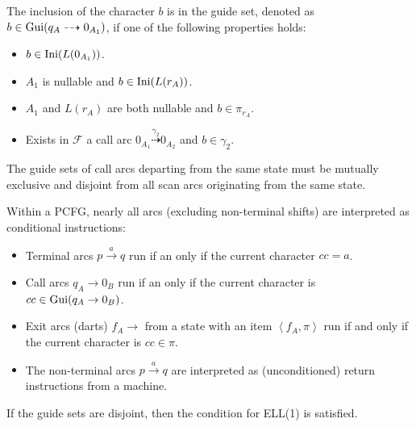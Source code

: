 The inclusion of the character $b$ is in the guide set, denoted as $b \in \textnormal{Gui}(q_A \dashrightarrow 0_{A_1})$, if one of the following properties holds:  
\begin{itemize}
    \item $b \in \textnormal{Ini}(L(0_{A_1}))$. 
    \item $A_1$ is nullable and $b \in \textnormal{Ini}(L(r_A))$. 
    \item $A_1$ and $L(r_A)$ are both nullable and $b \in \pi_{r_A}$.
    \item Exists in $\mathcal{F}$ a call arc $0_{A_1} \overset{\gamma_2}{\dashrightarrow} 0_{A_2}$ and $b \in \gamma_2$. 
\end{itemize}
The guide sets of call arcs departing from the same state must be mutually exclusive and disjoint from all scan arcs originating from the same state.

Within a PCFG, nearly all arcs (excluding non-terminal shifts) are interpreted as conditional instructions:
\begin{itemize}
    \item Terminal arcs $p \overset{a}{\rightarrow} q$ run if an only if the current character $cc=a$. 
    \item Call arcs $q_A \rightarrow 0_B$ run if an only if the current character is $cc \in \textnormal{Gui}(q_A \rightarrow 0_B)$. 
    \item Exit arcs (darts) $f_A \rightarrow$ from a state with an item $\left\langle f_A, \pi \right\rangle$ run if and only if the current character is $cc \in \pi$. 
    \item The non-terminal arcs $p \overset{a}{\rightarrow} q$ are interpreted as (unconditioned) return instructions from a machine. 
\end{itemize}
\begin{property}
    If the guide sets are disjoint, then the condition for ELL(1) is satisfied. 
\end{property}

